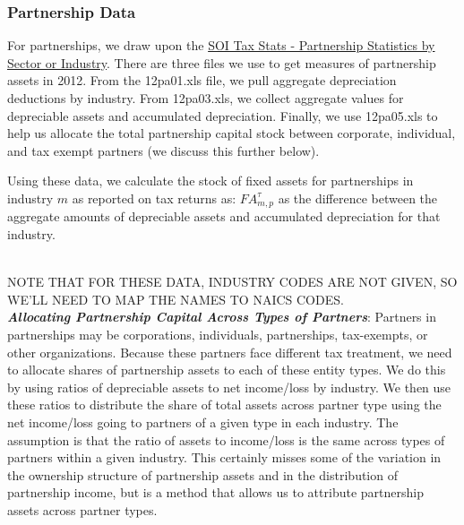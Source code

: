 \documentclass[article,11pt,letterpaper,fleqn]{article}
\theoremstyle{definition}
\numberwithin{equation}{section}
\begin{document}
\subsubsection{Partnership Data}

For partnerships, we draw upon the \href{http://www.irs.gov/uac/SOI-Tax-Stats-Partnership-Statistics-by-Sector-or-Industry}{SOI Tax Stats - Partnership Statistics by Sector or Industry}.  There are three files we use to get measures of partnership assets in 2012.  From the 12pa01.xls file, we pull aggregate depreciation deductions by industry.  From 12pa03.xls, we collect aggregate values for depreciable assets and accumulated depreciation.  Finally, we use 12pa05.xls to help us allocate the total partnership capital stock between corporate, individual, and tax exempt partners (we discuss this further below).

Using these data, we calculate the stock of fixed assets for partnerships in industry $m$ as reported on tax returns as: ${FA}^{\tau}_{m,p}$ as the difference between the aggregate amounts of depreciable assets and accumulated depreciation for that industry.  

\ \\
NOTE THAT FOR THESE DATA, INDUSTRY CODES ARE NOT GIVEN, SO WE'LL NEED TO MAP THE NAMES TO NAICS CODES.
\ \\
 
\textbf{\emph{Allocating Partnership Capital Across Types of Partners}}: Partners in partnerships may be corporations, individuals, partnerships, tax-exempts, or other organizations.  Because these partners face different tax treatment, we need to allocate shares of partnership assets to each of these entity types.  We do this by using ratios of depreciable assets to net income/loss by industry.  We then use these ratios to distribute the share of total assets across partner type using the net income/loss going to partners of a given type in each industry.  The assumption is that the ratio of assets to income/loss is the same across types of partners within a given industry.  This certainly misses some of the variation in the ownership structure of partnership assets and in the distribution of partnership income, but is a method that allows us to attribute partnership assets across partner types.
\end{document}
